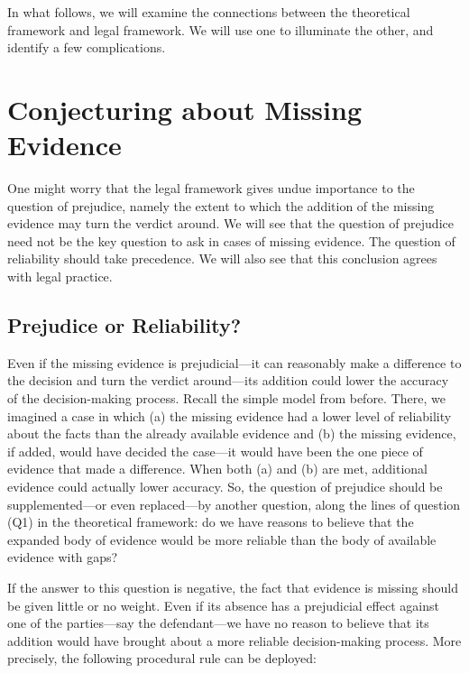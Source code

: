 \documentclass[
  10pt,
  dvipsnames,enabledeprecatedfontcommands]{scrartcl}
\begin{document}
In what follows, we will examine the connections between the theoretical
framework and legal framework. We will use one to illuminate the other,
and identify a few complications.

\hypertarget{conjecturing-about-missing-evidence}{%
\section{Conjecturing about Missing
Evidence}\label{conjecturing-about-missing-evidence}}

One might worry that the legal framework gives undue importance to the
question of prejudice, namely the extent to which the addition of the
missing evidence may turn the verdict around. We will see that the
question of prejudice need not be the key question to ask in cases of
missing evidence. The question of reliability should take precedence. We
will also see that this conclusion agrees with legal practice.

\hypertarget{prejudice-or-reliability}{%
\subsection{Prejudice or Reliability?}\label{prejudice-or-reliability}}

Even if the missing evidence is prejudicial---it can reasonably make a
difference to the decision and turn the verdict around---its addition
could lower the accuracy of the decision-making process. Recall the
simple model from before. There, we imagined a case in which (a) the
missing evidence had a lower level of reliability about the facts than
the already available evidence and (b) the missing evidence, if added,
would have decided the case---it would have been the one piece of
evidence that made a difference. When both (a) and (b) are met,
additional evidence could actually lower accuracy. So, the question of
prejudice should be supplemented---or even replaced---by another
question, along the lines of question (Q1) in the theoretical framework:
do we have reasons to believe that the expanded body of evidence would
be more reliable than the body of available evidence with gaps?

If the answer to this question is negative, the fact that evidence is
missing should be given little or no weight. Even if its absence has a
prejudicial effect against one of the parties---say the defendant---we
have no reason to believe that its addition would have brought about a
more reliable decision-making process. More precisely, the following
procedural rule can be deployed:
\end{document}
